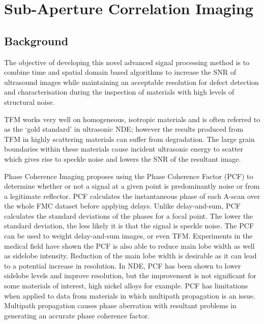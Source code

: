 
\chapter{Sub-Aperture Correlation Imaging}\label{chap:SASACI}

\graphicspath{{SASACI/Images/}{SASACI/Images/Apodizations/}{SASACI/Images/ApertureSize/}}

\section{Background}
The objective of developing this novel advanced signal processing method is to combine time and spatial domain based algorithms to increase the SNR of ultrasound images while maintaining an acceptable resolution for defect detection and characterisation during the inspection of materials with high levels of structural noise. 

TFM works very well on homogeneous, isotropic materials and is often referred to as the `gold standard' in ultrasonic NDE\cite{fan_comparison_2014}; however the results produced from TFM in highly scattering materials can suffer from degradation\cite{lane_inspection_2010}. The large grain boundaries within these materials cause incident ultrasonic energy to scatter which gives rise to speckle noise and lowers the SNR of the resultant image.

Phase Coherence Imaging proposes using the Phase Coherence Factor (PCF) to determine whether or not a signal at a given point is predominantly noise or from a legitimate reflector\cite{camacho_phase_2009}. PCF calculates the instantaneous phase of each A-scan over the whole FMC dataset before applying delays. Unlike delay-and-sum, PCF calculates the standard deviations of the phases for a focal point. The lower the standard deviation, the less likely it is that the signal is speckle noise. The PCF can be used to weight delay-and-sum images, or even TFM. Experiments in the medical field have shown the PCF is also able to reduce main lobe width as well as sidelobe intensity. Reduction of the main lobe width is desirable as it can lead to a potential increase in resolution. In NDE, PCF has been shown to lower sidelobe levels and improve resolution, but the improvement is not significant for some materials of interest, high nickel alloys for example\cite{camacho_phase_2011}. PCF has limitations when applied to data from materials in which multipath propagation is an issue. Multipath propagation causes phase aberration with resultant problems in generating an accurate phase coherence factor. 

